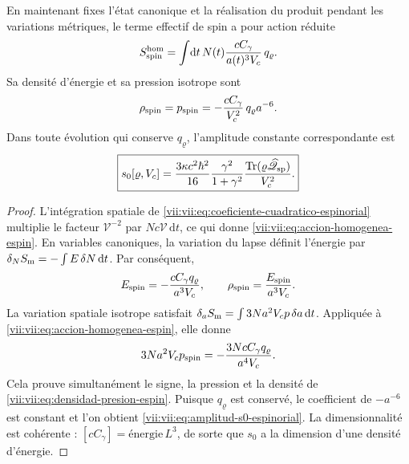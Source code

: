 \begin{theorem}
\label{vii:vii:thm:amplitud-material-explicita}
En maintenant fixes l'état canonique et la réalisation du produit
pendant les variations métriques, le terme effectif de spin a pour
action réduite
\begin{equation}
 S_{\rm spin}^{\rm hom}
 =\int\!\mathrm dt\,N(t)
       \frac{cC_\gamma}{a(t)^3V_c}\,q_\varrho.
 \label{vii:vii:eq:accion-homogenea-espin}
\end{equation}
Sa densité d'énergie et sa pression isotrope sont
\begin{equation}
 \rho_{\rm spin}=p_{\rm spin}
 =-\frac{cC_\gamma}{V_c^2}\,q_\varrho a^{-6}.
 \label{vii:vii:eq:densidad-presion-espin}
\end{equation}
Dans toute évolution qui conserve \(q_\varrho\), l'amplitude constante correspondante est
\begin{equation}
 \boxed{\displaystyle
 s_0[\varrho,V_c]
 =\frac{3\kappa c^2\hbar^2}{16}
    \frac{\gamma^2}{1+\gamma^2}
    \frac{\operatorname{Tr}
       (\varrho\widehat{\mathscr Q}_{\rm sp})}{V_c^2}.}
 \label{vii:vii:eq:amplitud-s0-espinorial}
\end{equation}
\end{theorem}
\begin{proof}
L'intégration spatiale de
\eqref{vii:vii:eq:coeficiente-cuadratico-espinorial} multiplie le
facteur \(\mathcal V^{-2}\) par
\(Nc\mathcal V\,\mathrm dt\), ce qui donne
\eqref{vii:vii:eq:accion-homogenea-espin}. En variables canoniques,
la variation du lapse définit l'énergie par
\(\delta_N S_{\rm m}=-\int E\,\delta N\,\mathrm dt\).
Par conséquent,
\[
 E_{\rm spin}=-\frac{cC_\gamma q_\varrho}{a^3V_c},
 \qquad \rho_{\rm spin}=\frac{E_{\rm spin}}{a^3V_c}.
\]
La variation spatiale isotrope satisfait \(\delta_a S_{\rm m}=\int3Na^2V_c p\,\delta a\,\mathrm dt\). Appliquée à \eqref{vii:vii:eq:accion-homogenea-espin}, elle donne
\[
 3Na^2V_c p_{\rm spin}
 =-\frac{3NcC_\gamma q_\varrho}{a^4V_c}.
\]
Cela prouve simultanément le signe, la pression et la densité de \eqref{vii:vii:eq:densidad-presion-espin}. Puisque \(q_\varrho\) est conservé, le coefficient de \(-a^{-6}\) est constant et l'on obtient \eqref{vii:vii:eq:amplitud-s0-espinorial}. La dimensionnalité est cohérente : \([cC_\gamma]=\text{énergie}\,L^3\), de sorte que \(s_0\) a la dimension d'une densité d'énergie.
\end{proof}

